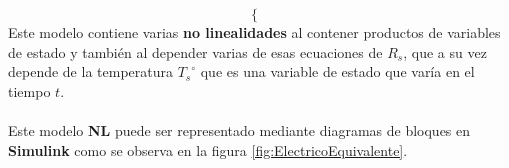 \documentclass[10pt]{article}
\begin{document}
\begin{enumerate}
\begin{itemize}
\begin{equation}
\begin{cases}
			\end{cases}
		\end{equation}
		Este modelo contiene varias \textbf{no linealidades} al contener productos de variables de estado y también al depender varias de esas ecuaciones de $R_{s}$, que a su vez depende de la temperatura ${T_{s}}^{\circ}$ que es una variable de estado que varía en el tiempo $t$.
		\\
		\\
		Este modelo \textbf{NL} puede ser representado mediante diagramas de bloques en \textbf{Simulink} como se observa en la figura \ref{fig:ElectricoEquivalente}.

	\end{itemize}
  


\end{enumerate}
\end{document}
